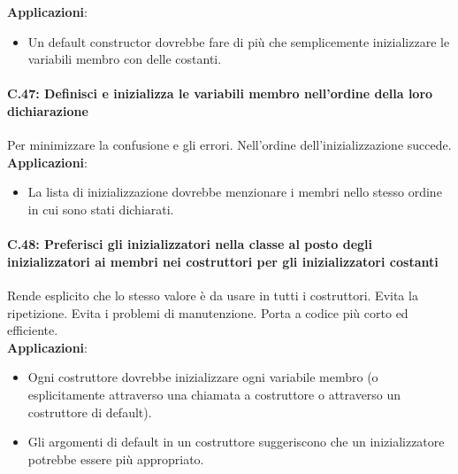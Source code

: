 \textsf{\small \textbf{Applicazioni}: }

\begin{itemize}
	\item \textsf{\small Un default constructor dovrebbe fare di più che semplicemente inizializzare le variabili membro con delle costanti.}
\end{itemize}

\paragraph{C.47: Definisci e inizializza le variabili membro nell'ordine della loro dichiarazione}

\textsf{\small Per minimizzare la confusione e gli errori. Nell'ordine dell'inizializzazione succede.} \\

\textsf{\small \textbf{Applicazioni}: }

\begin{itemize}
	\item \textsf{\small La lista di inizializzazione dovrebbe menzionare i membri nello stesso ordine in cui sono stati dichiarati.}
\end{itemize}

\paragraph{C.48: Preferisci gli inizializzatori nella classe al posto degli inizializzatori ai membri nei costruttori per gli inizializzatori costanti} %

\textsf{\small Rende esplicito che lo stesso valore è da usare in tutti i costruttori. Evita la ripetizione. Evita i problemi di manutenzione. Porta a codice più corto ed efficiente.} \\

\textsf{\small \textbf{Applicazioni}: }

\begin{itemize}
	\item \textsf{\small Ogni costruttore dovrebbe inizializzare ogni variabile membro (o esplicitamente attraverso una chiamata a costruttore o attraverso un costruttore di default).}
	\item \textsf{\small Gli argomenti di default in un costruttore suggeriscono che un inizializzatore potrebbe essere più appropriato.}
\end{itemize}

